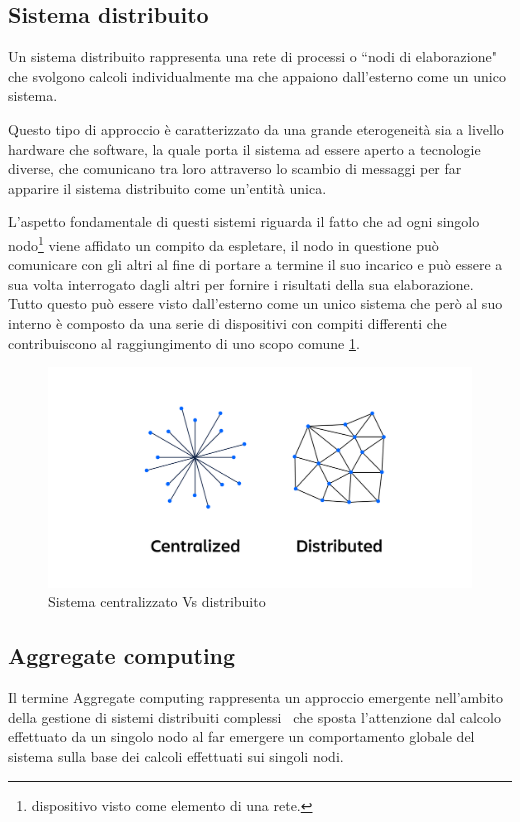 \documentclass[12pt,a4paper,openright,twoside]{book}
\begin{document}
\subsection{Sistema distribuito}
Un sistema distribuito rappresenta una rete di processi o ``nodi di elaborazione" che svolgono calcoli individualmente ma che appaiono dall'esterno come un unico sistema.

Questo tipo di approccio è caratterizzato da una grande eterogeneità sia a livello hardware che software, la quale porta il sistema ad essere aperto a tecnologie diverse, che comunicano tra loro attraverso lo scambio di messaggi per far apparire il sistema distribuito come un'entità unica.

L'aspetto fondamentale di questi sistemi riguarda il fatto che ad ogni singolo nodo\footnote{dispositivo visto come elemento di una rete.} viene affidato un compito da espletare, il nodo in questione può comunicare con gli altri al fine di portare a termine il suo incarico e può essere a sua volta interrogato dagli altri per fornire i risultati della sua elaborazione.
Tutto questo può essere visto dall'esterno come un unico sistema che però al suo interno è composto da una serie di dispositivi con compiti differenti che contribuiscono al raggiungimento di uno scopo comune \ref{fig:centralizedVsDistributed}.
\begin{figure}[h!]
	\centering
	\includegraphics[width=0.8\linewidth]{figures/centralizedVsDistributed.png}
	\caption{Sistema centralizzato Vs distribuito~\cite{centralizedVsDistributed}}
	\label{fig:centralizedVsDistributed}
\end{figure}

\subsection{Aggregate computing}
Il termine Aggregate computing rappresenta un approccio emergente nell'ambito della gestione di sistemi distribuiti complessi~\cite{VIROLI2019100486} che sposta l'attenzione dal calcolo effettuato da un singolo nodo al far emergere un comportamento globale del sistema sulla base dei calcoli effettuati sui singoli nodi.
\end{document}
